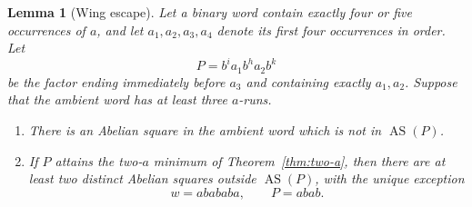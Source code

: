 \documentclass[11pt]{article}
\newtheorem{lemma}[theorem]{Lemma}
\theoremstyle{definition}
\newcommand{\AS}{\operatorname{AS}}
\begin{document}
\begin{lemma}[Wing escape]\label{lem:wing-escape}
Let a binary word contain exactly four or five occurrences of $a$, and let $a_1,a_2,a_3,a_4$ denote its first four occurrences in order. Let
\[
 P=b^i a_1 b^h a_2 b^k
\]
be the factor ending immediately before $a_3$ and containing exactly $a_1,a_2$. Suppose that the ambient word has at least three $a$-runs.
\begin{enumerate}[label=\textup{(\roman*)}]
\item There is an Abelian square in the ambient word which is not in $\AS(P)$.
\item If $P$ attains the two-$a$ minimum of Theorem~\ref{thm:two-a}, then there are at least two distinct Abelian squares outside $\AS(P)$, with the unique exception
\[
 w=abababa,\qquad P=abab.
\]
\end{enumerate}
\end{lemma}
\end{document}
